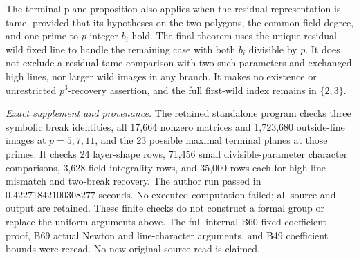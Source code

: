 \begin{remark}
\label{rem:B-RD82-scope}
The terminal-plane proposition also applies when the residual
representation is tame, provided that its hypotheses on the
two polygons, the common field degree, and one prime-to-\(p\)
integer \(b_i\) hold. The final theorem uses the unique
residual wild fixed line to handle the remaining case with
both \(b_i\) divisible by \(p\). It does not exclude a
residual-tame comparison with two such parameters and
exchanged high lines, nor larger wild images in any branch.
It makes no existence or unrestricted \(p^3\)-recovery
assertion, and the full first-wild index remains in \(\{2,3\}\).

\smallskip
\noindent\emph{Exact supplement and provenance.}
The retained standalone program
checks three symbolic break identities, all 17,664 nonzero
matrices and 1,723,680 outside-line images at \(p=5,7,11\),
and the 23 possible maximal terminal planes at those primes.
It checks 24 layer-shape rows, 71,456 small divisible-parameter
character comparisons, 3,628 field-integrality rows, and
35,000 rows each for high-line mismatch and two-break recovery.
The author run passed in \(0.42271842100308277\) seconds.
No executed computation failed; all source and output are
retained. These finite checks do not construct a formal
group or replace the uniform arguments above. The full
internal B60 fixed-coefficient proof, B69 actual Newton
and line-character arguments, and B49 coefficient bounds
were reread. No new original-source read is claimed.
\end{remark}
